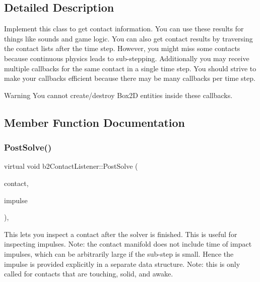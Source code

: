 \subsection{Detailed Description}
Implement this class to get contact information. You can use these results for things like sounds and game logic. You can also get contact results by traversing the contact lists after the time step. However, you might miss some contacts because continuous physics leads to sub-\/stepping. Additionally you may receive multiple callbacks for the same contact in a single time step. You should strive to make your callbacks efficient because there may be many callbacks per time step. \begin{DoxyWarning}{Warning}
You cannot create/destroy Box2D entities inside these callbacks. 
\end{DoxyWarning}


\subsection{Member Function Documentation}
\mbox{\label{classb2_contact_listener_acd58ec96f7569b95eec65b8ca3f8013d}} 
\subsubsection{\texorpdfstring{Post\+Solve()}{PostSolve()}}
{\footnotesize\ttfamily virtual void b2\+Contact\+Listener\+::\+Post\+Solve (\begin{DoxyParamCaption}\item[{\hyperlink{classb2_contact}{b2\+Contact} $\ast$}]{contact,  }\item[{const \hyperlink{structb2_contact_impulse}{b2\+Contact\+Impulse} $\ast$}]{impulse }\end{DoxyParamCaption})\hspace{0.3cm}{\ttfamily [inline]}, {\ttfamily [virtual]}}

This lets you inspect a contact after the solver is finished. This is useful for inspecting impulses. Note\+: the contact manifold does not include time of impact impulses, which can be arbitrarily large if the sub-\/step is small. Hence the impulse is provided explicitly in a separate data structure. Note\+: this is only called for contacts that are touching, solid, and awake. \mbox{\label{classb2_contact_listener_a416f85eb45a1099053402b15a19a7de0}} 
